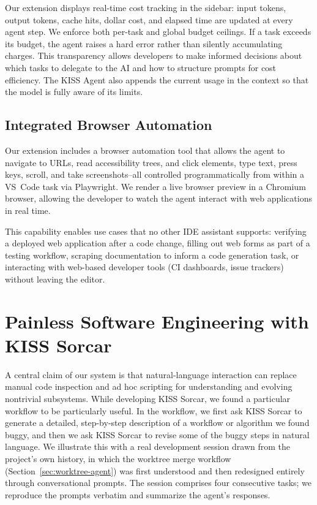 \documentclass{article}
\begin{document}
Our extension displays real-time cost tracking in the sidebar: input tokens, output tokens, cache hits, dollar cost, and elapsed time are updated at every agent step.  We enforce both per-task and global budget ceilings.  If a task exceeds its budget, the agent raises a hard error rather than silently accumulating charges.  This transparency allows developers to make informed decisions about which tasks to delegate to the AI and how to structure prompts for cost efficiency.  The KISS Agent also appends the current usage in the context so that the model is fully aware of its limits.

\subsection{Integrated Browser Automation}
\label{sec:browser-feature}

Our extension includes a browser automation tool that allows the agent to navigate to URLs, read accessibility trees, and click elements, type text, press keys, scroll, and take screenshots--all controlled programmatically from within a VS~Code task via Playwright. We render a live browser preview in a Chromium browser, allowing the developer to watch the agent interact with web applications in real time.

This capability enables use cases that no other IDE assistant supports: verifying a deployed web application after a code change, filling out web forms as part of a testing workflow, scraping documentation to inform a code generation task, or interacting with web-based developer tools (CI dashboards, issue trackers) without leaving the editor.


\section{Painless Software Engineering with KISS Sorcar}
\label{sec:painless}

A central claim of our system is that natural-language interaction can replace manual code inspection and ad hoc scripting for understanding and evolving nontrivial subsystems.  While developing KISS Sorcar, we found a particular workflow to be particularly useful.  In the workflow, we first ask KISS Sorcar to generate a detailed, step-by-step description of a workflow or algorithm we found buggy, and then we ask KISS Sorcar to revise some of the buggy steps in natural language. We illustrate this with a real development session drawn from the project's own history, in which the worktree merge workflow (Section~\ref{sec:worktree-agent}) was first understood and then redesigned entirely through conversational prompts.  The session comprises four consecutive tasks; we reproduce the prompts verbatim and summarize the agent's responses.
\end{document}
